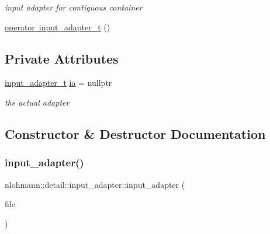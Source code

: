 \begin{DoxyCompactItemize}
\begin{DoxyCompactList}\small\item\em input adapter for contiguous container \end{DoxyCompactList}\item 
\mbox{\hyperlink{classnlohmann_1_1detail_1_1input__adapter_a4ef04b9490247fc38f3d1c2a9e18789b}{operator input\+\_\+adapter\+\_\+t}} ()
\end{DoxyCompactItemize}
\subsection*{Private Attributes}
\begin{DoxyCompactItemize}
\item 
\mbox{\hyperlink{namespacenlohmann_1_1detail_ae132f8cd5bb24c5e9b40ad0eafedf1c2}{input\+\_\+adapter\+\_\+t}} \mbox{\hyperlink{classnlohmann_1_1detail_1_1input__adapter_ad5a11d0b65b68f6950cfbe8c8366b7da}{ia}} = nullptr
\begin{DoxyCompactList}\small\item\em the actual adapter \end{DoxyCompactList}\end{DoxyCompactItemize}


\subsection{Constructor \& Destructor Documentation}
\mbox{\label{classnlohmann_1_1detail_1_1input__adapter_a19fb8c28f37b23099a4353acf0a9a2f1}} 
\subsubsection{\texorpdfstring{input\_adapter()}{input\_adapter()}\hspace{0.1cm}{\footnotesize\ttfamily [1/11]}}
{\footnotesize\ttfamily nlohmann\+::detail\+::input\+\_\+adapter\+::input\+\_\+adapter (\begin{DoxyParamCaption}\item[{std\+::\+F\+I\+LE $\ast$}]{file }\end{DoxyParamCaption})\hspace{0.3cm}{\ttfamily [inline]}}


